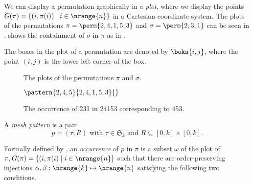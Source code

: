 We can display a permutation graphically in a \emph{plot}, where we display the points
\(G(\pi) = \{(i,\pi(i))\mid i \in \nrange{n} \}\) in a Cartesian coordinate system. The plots of the permutations \(\pi =
\perm{2,4,1,5,3}\) and \(\sigma = \perm{2,3,1}\) can be seen in .
 shows the containment of \(\sigma\) in \(\pi\) as in .

The boxes in the plot of a permutation are denoted by \(\boks{i,j}\), where the point \((i,j)\) is
the lower left corner of the box.

\begin{figure}[htb]
    \begin{center}
    \raisebox{6ex}{\(G(\pi)=\)}

        \caption{The plots of the permutations \(\pi\) and \(\sigma\).}
        \label{fig:plots}
    \end{center}
\end{figure}

\begin{figure}[htb]
    \begin{center}
    \(\pattern{2,4,5}{2,4,1,5,3}{}\)
        \caption{The occurrence of 231 in 24153 corresponding to 453.}
        \label{fig:containment}
    \end{center}
\end{figure}

\begin{definition}
A \emph{mesh pattern} is a pair
\begin{equation*}
    p = (\tau,R)\text{ with } \tau \in \mathfrak{S}_k \text{ and } R \subseteq [0,k]\times [0,k].
\end{equation*}
\end{definition}

Formally defined by \textcite{journals/combinatorics/BrandenC11},
an \emph{occurrence} of \(p\) in \(\pi\) is a subset \(\omega\) of the plot of
\(\pi, G(\pi) = \{(i,\pi(i)\mid i\in\nrange{n}\}\) such that there are order-preserving
injections \(\alpha,\beta:\nrange{k}\mapsto\nrange{n}\) satisfying the following two conditions.

